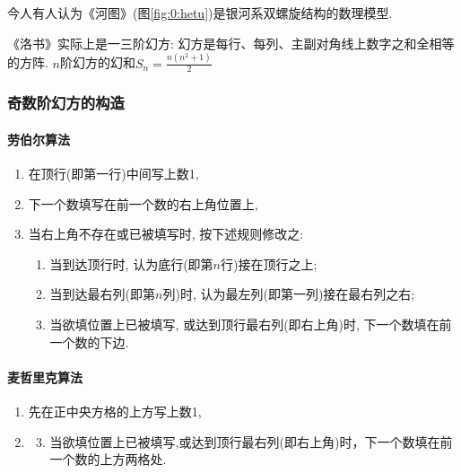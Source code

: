         今人有人认为《河图》(图\ref{fig:0:hetu})是银河系双螺旋结构的数理模型.

        《洛书》实际上是一三阶幻方: \textsf{幻方}是每行、每列、主副对角线上数字之和全相等的方阵. $n$阶幻方的\textsf{幻和}$S_n=\frac{n(n^2+1)}{2}$

        \subsubsection{奇数阶幻方的构造}

            \paragraph{劳伯尔算法}

                \begin{enumerate}
                    \item 在顶行(即第一行)中间写上数1,
                    \item 下一个数填写在前一个数的右上角位置上,
                    \item 当右上角不存在或已被填写时, 按下述规则修改之:
                        \begin{enumerate}
                            \item 当到达顶行时, 认为底行(即第$n$行)接在顶行之上;
                            \item 当到达最右列(即第$n$列)时, 认为最左列(即第一列)接在最右列之右;
                            \item 当欲填位置上已被填写, 或达到顶行最右列(即右上角)时, 下一个数填在前一个数的下边.
                        \end{enumerate}
                \end{enumerate}

            \paragraph{麦哲里克算法}

                \begin{enumerate}
                    \item 先在正中央方格的上方写上数1,
                    \setcounter{enumi}{2}
                    \item 
                        \begin{enumerate}
                            \setcounter{enumii}{2}
                            \item 当欲填位置上已被填写,或达到顶行最右列(即右上角)时，下一个数填在前一个数的上方两格处.
                        \end{enumerate}
                \end{enumerate}
